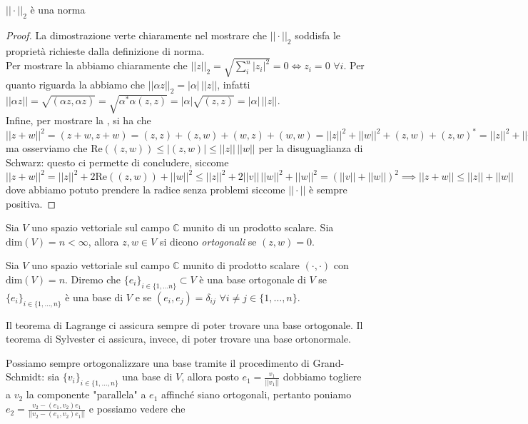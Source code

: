 \documentclass[12pt, twoside, italian, openany]{book}
\begin{document}
	\begin{prop}
		$||\cdot||_2$ è una norma
	\end{prop}
	\begin{proof}
		La dimostrazione verte chiaramente nel mostrare che $||\cdot||_2$ soddisfa le proprietà richieste dalla definizione di norma. \\
		Per mostrare la  abbiamo chiaramente che $||z||_2 = \sqrt{\sum_{i}^n |z_i|^2} = 0 \iff z_i = 0 \, \, \forall i$. Per quanto riguarda la  abbiamo che $||\alpha z||_2 = |\alpha| \, ||z||$, infatti $||\alpha z|| = \sqrt{(\alpha z, \alpha z)} = \sqrt{\alpha^* \alpha (z, z)} = |\alpha| \sqrt{(z, z)} = |\alpha| \, ||z||$. \\
		Infine, per mostrare la , si ha che $||z + w||^2 = (z + w, z+ w) = (z, z) + (z, w) + (w, z) + (w, w) = ||z||^2 + ||w||^2 + (z, w) + (z, w)^* = ||z||^2 + ||w||^2 + 2\text{Re}((z, w))$ ma osserviamo che $\text{Re}((z, w)) \leq |(z,w)| \leq ||z|| \, ||w||$ per la disuguaglianza di Schwarz: questo ci permette di concludere, siccome $||z + w||^2 = ||z||^2 + 2\text{Re}((z,w)) +  ||w||^2 \leq ||z||^2 + 2||v|| \, ||w||^2 + ||w||^2 = (||v|| + ||w||)^2 \implies ||z+w|| \leq ||z|| + ||w||$ dove abbiamo potuto prendere la radice senza problemi siccome $||\cdot||$ è sempre positiva.
	\end{proof}
	\begin{definition}
		Sia $V$ uno spazio vettoriale sul campo $\mathbb{C}$ munito di un prodotto scalare. Sia $\text{dim}(V) = n < \infty$, allora $z, w \in V$ si dicono \emph{ortogonali} se $(z,w) = 0$. 
	\end{definition}
	\begin{definition}
		Sia $V$ uno spazio vettoriale sul campo $\mathbb{C}$ munito di prodotto scalare $(\cdot, \cdot)$ con $\text{dim}(V) = n$. Diremo che $\{ e_i \}_{i\in \{1, \ldots n \}} \subset V$ è una base ortogonale di $V$ se $\{ e_i \}_{i \in \{1, \ldots, n \}}$ è una base di $V$ e se $(e_i, e_j) = \delta_{ij} \, \, \forall i \neq j \in \{ 1, \ldots, n\}$.
	\end{definition}
	\begin{remark}
		Il teorema di Lagrange ci assicura sempre di poter trovare una base ortogonale. Il teorema di Sylvester ci assicura, invece, di poter trovare una base ortonormale.
	\end{remark}
	Possiamo sempre ortogonalizzare una base tramite il procedimento di Grand-Schmidt: sia $\{v_i \}_{i \in \{ 1, \ldots, n \}}$ una base di $V$, allora posto $e_1 = \frac{v_1}{||v_1||}$ dobbiamo togliere a $v_2$ la componente "parallela" a $e_1$ affinché siano ortogonali, pertanto poniamo $e_2 = \frac{v_2 - (e_1, v_2) e_1}{||v_2 - (e_1, v_2)e_1||}$ e possiamo vedere che
\end{document}
